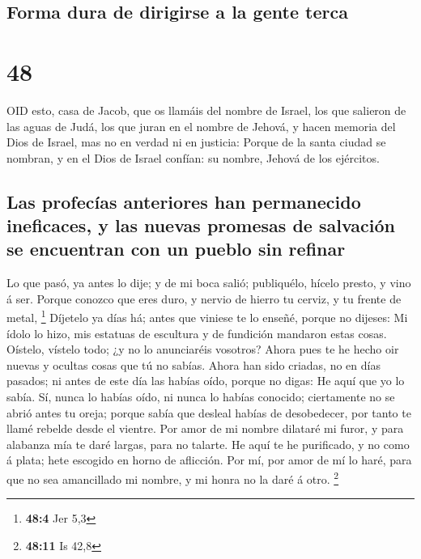 \hypertarget{forma-dura-de-dirigirse-a-la-gente-terca}{%
\subsection{Forma dura de dirigirse a la gente
terca}\label{forma-dura-de-dirigirse-a-la-gente-terca}}

\hypertarget{section-47}{%
\section{48}\label{section-47}}

 OID esto, casa de Jacob, que os llamáis del nombre de
Israel, los que salieron de las aguas de Judá, los que juran en el
nombre de Jehová, y hacen memoria del Dios de Israel, mas no en verdad
ni en justicia:  Porque de la santa ciudad se nombran, y en
el Dios de Israel confían: su nombre, Jehová de los ejércitos.

\hypertarget{las-profecuxedas-anteriores-han-permanecido-ineficaces-y-las-nuevas-promesas-de-salvaciuxf3n-se-encuentran-con-un-pueblo-sin-refinar}{%
\subsection{Las profecías anteriores han permanecido ineficaces, y las
nuevas promesas de salvación se encuentran con un pueblo sin
refinar}\label{las-profecuxedas-anteriores-han-permanecido-ineficaces-y-las-nuevas-promesas-de-salvaciuxf3n-se-encuentran-con-un-pueblo-sin-refinar}}

 Lo que pasó, ya antes lo dije; y de mi boca salió;
publiquélo, hícelo presto, y vino á ser.  Porque conozco que
eres duro, y nervio de hierro tu cerviz, y tu frente de metal,
\footnote{\textbf{48:4} Jer 5,3}  Díjetelo ya días há; antes
que viniese te lo enseñé, porque no dijeses: Mi ídolo lo hizo, mis
estatuas de escultura y de fundición mandaron estas cosas. 
Oístelo, vístelo todo; ¿y no lo anunciaréis vosotros? Ahora pues te he
hecho oir nuevas y ocultas cosas que tú no sabías.  Ahora
han sido criadas, no en días pasados; ni antes de este día las habías
oído, porque no digas: He aquí que yo lo sabía.  Sí, nunca
lo habías oído, ni nunca lo habías conocido; ciertamente no se abrió
antes tu oreja; porque sabía que desleal habías de desobedecer, por
tanto te llamé rebelde desde el vientre.  Por amor de mi
nombre dilataré mi furor, y para alabanza mía te daré largas, para no
talarte.  He aquí te he purificado, y no como á plata; hete
escogido en horno de aflicción.  Por mí, por amor de mí lo
haré, para que no sea amancillado mi nombre, y mi honra no la daré á
otro. \footnote{\textbf{48:11} Is 42,8}

